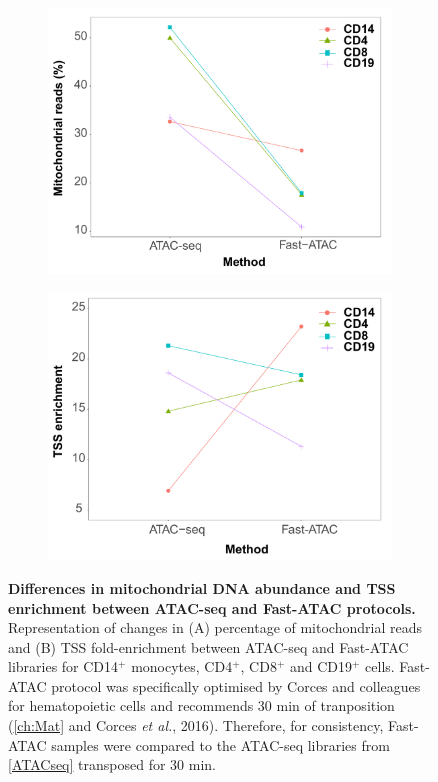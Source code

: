 \begin{figure}[htbp]
\centering
\begin{subfigure}{0.5\textwidth}
\centering
\includegraphics[width=\textwidth]{./Results1/pdfs/ATAC_vs_FAST_ATAC_percnt_MT_reads_dotplot}
\caption{\textbf{}}
\end{subfigure}%
\begin{subfigure}{0.5\textwidth}
\centering
\includegraphics[width=\textwidth]{./Results1/pdfs/ATAC_vs_FAST_ATAC_tss_dotplot}
\caption{\textbf{}}
\end{subfigure}
\caption[Differences in mitochondrial DNA abundance and TSS enrichment between ATAC-seq and Fast-ATAC protocols.]{\textbf{Differences in mitochondrial DNA abundance and TSS enrichment between ATAC-seq and Fast-ATAC protocols.} Representation of changes in (A) percentage of mitochondrial reads and (B) TSS fold-enrichment between ATAC-seq and Fast-ATAC libraries for CD14$^+$ monocytes, CD4$^+$, CD8$^+$ and CD19$^+$ cells. Fast-ATAC protocol was specifically optimised by Corces and colleagues for hematopoietic cells and recommends 30 min of tranposition (\ref{ch:Mat} and Corces \textit{et al.}, 2016). Therefore, for consistency, Fast-ATAC samples were compared to the ATAC-seq libraries from \ref{ATACseq} transposed for 30 min.}

\end{figure}
